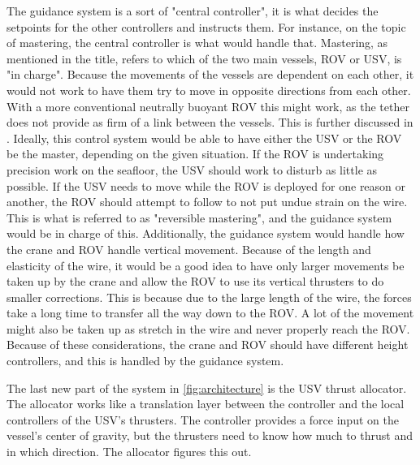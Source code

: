 \documentclass[class=article, crop=false]{standalone}
\begin{document}
The guidance system is a sort of "central controller", it is what decides the setpoints for the other controllers and instructs them. For instance, on the topic of mastering, the central controller is what would handle that. Mastering, as mentioned in the title, refers to which of the two main vessels, ROV or USV, is "in charge". Because the movements of the vessels are dependent on each other, it would not work to have them try to move in opposite directions from each other. With a more conventional neutrally buoyant ROV this might work, as the tether does not provide as firm of a link between the vessels. This is further discussed in \cite{specialization}. Ideally, this control system would be able to have either the USV or the ROV be the master, depending on the given situation. If the ROV is undertaking precision work on the seafloor, the USV should work to disturb as little as possible. If the USV needs to move while the ROV is deployed for one reason or another, the ROV should attempt to follow to not put undue strain on the wire. This is what is referred to as "reversible mastering", and the guidance system would be in charge of this. Additionally, the guidance system would handle how the crane and ROV handle vertical movement. Because of the length and elasticity of the wire, it would be a good idea to have only larger movements be taken up by the crane and allow the ROV to use its vertical thrusters to do smaller corrections. This is because due to the large length of the wire, the forces take a long time to transfer all the way down to the ROV. A lot of the movement might also be taken up as stretch in the wire and never properly reach the ROV. Because of these considerations, the crane and ROV should have different height controllers, and this is handled by the guidance system.

The last new part of the system in \cref{fig:architecture} is the USV thrust allocator. The allocator works like a translation layer between the controller and the local controllers of the USV's thrusters. The controller provides a force input on the vessel's center of gravity, but the thrusters need to know how much to thrust and in which direction. The allocator figures this out.
\end{document}
